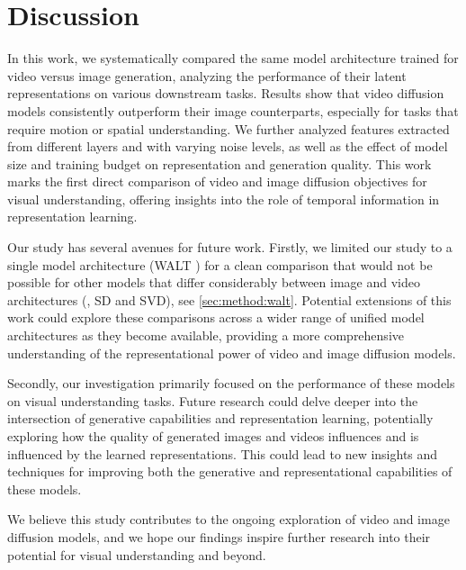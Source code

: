 \section{Discussion}
\label{sec:conclusion}

In this work, we systematically compared the same model architecture trained for video versus image generation, analyzing the performance of their latent representations on various downstream tasks.
Results show that video diffusion models consistently outperform their image counterparts, especially for tasks that require motion or spatial understanding.
We further analyzed features extracted from different layers and with varying noise levels, as well as the effect of model size and training budget on representation and generation quality.
This work marks the first direct comparison of video and image diffusion objectives for visual understanding, offering insights into the role of temporal information in representation learning.

Our study has several avenues for future work.
Firstly, we limited our study to a single model architecture (WALT \cite{walt}) for a clean comparison that would not be possible for other models that differ considerably between image and video architectures (\eg, SD and SVD), see \cref{sec:method:walt}.
Potential extensions of this work could explore these comparisons across a wider range of unified model architectures as they become available, providing a more comprehensive understanding of the representational power of video and image diffusion models.

Secondly, our investigation primarily focused on the performance of these models on visual understanding tasks.
Future research could delve deeper into the intersection of generative capabilities and representation learning, potentially exploring how the quality of generated images and videos influences and is influenced by the learned representations.
This could lead to new insights and techniques for improving both the generative and representational capabilities of these models.

We believe this study contributes to the ongoing exploration of video and image diffusion models, and we hope our findings inspire further research into their potential for visual understanding and beyond.

\balance
